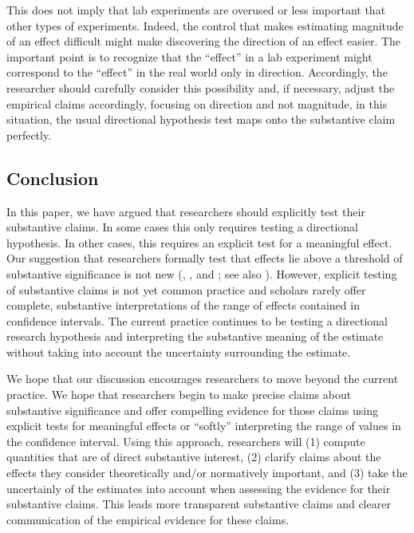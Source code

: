 \documentclass[12pt]{article}
\begin{document}
This does not imply that lab experiments are overused or less important that other types of experiments. Indeed, the control that makes estimating magnitude of an effect difficult might make discovering the direction of an effect easier. The important point is to recognize that the ``effect'' in a lab experiment might correspond to the ``effect'' in the real world only in direction. Accordingly, the researcher should carefully consider this possibility and, if necessary, adjust the empirical claims accordingly, focusing on direction and not magnitude, in this situation, the usual directional hypothesis test maps onto the substantive claim perfectly.


\subsection*{Conclusion}

In this paper, we have argued that researchers should explicitly test their substantive claims. In some cases this only requires testing a directional hypothesis. In other cases, this requires an explicit test for a meaningful effect. Our suggestion that researchers formally test that effects lie above a threshold of substantive significance is not new (\citealt{Achen1982}, \citealt{Rainey2014}, and \citealt{Gross2014}; see also \citealt{EsareyDanneman2014}). However, explicit testing of substantive claims is not yet common practice and scholars rarely offer complete, substantive interpretations of the range of effects contained in confidence intervals. The current practice continues to be testing a directional research hypothesis and interpreting the substantive meaning of the estimate without taking into account the uncertainty surrounding the estimate. 

We hope that our discussion encourages researchers to move beyond the current practice. We hope that researchers begin to make precise claims about substantive significance and offer compelling evidence for those claims using explicit tests for meaningful effects or ``softly'' interpreting the range of values in the confidence interval. Using this approach, researchers will (1) compute quantities that are of direct substantive interest, (2) clarify claims about the effects they consider theoretically and/or normatively important, and (3) take the uncertainly of the estimates into account when assessing the evidence for their substantive claims. This leads more transparent substantive claims and clearer communication of the empirical evidence for these claims.

\singlespace 
\newpage
\normalsize
\doublespace

%

%
\end{document}

